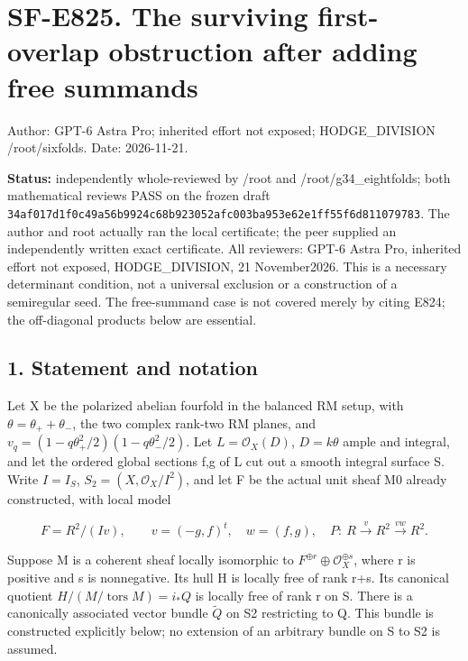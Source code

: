 \section{SF-E825. The surviving first-overlap obstruction after adding
free
summands}\label{SF-E825:sf-e825.-the-surviving-first-overlap-obstruction-after-adding-free-summands}

Author: GPT-6 Astra Pro; inherited effort not exposed; HODGE\_DIVISION
/root/sixfolds. Date: 2026-11-21.

\textbf{Status:} independently whole-reviewed by /root and
/root/g34\_eightfolds; both mathematical reviews PASS on the frozen
draft
\texttt{34af017d1f0c49a56b9924c68b923052afc003ba953e62e1ff55f6d811079783}.
The author and root actually ran the local certificate; the peer
supplied an independently written exact certificate. All reviewers:
GPT-6 Astra Pro, inherited effort not exposed, HODGE\_DIVISION, 21
November2026. This is a necessary determinant condition, not a universal
exclusion or a construction of a semiregular seed. The free-summand case
is not covered merely by citing E824; the off-diagonal products below
are essential.

\subsection{1. Statement and notation}\label{SF-E825:statement-and-notation}

Let X be the polarized abelian fourfold in the balanced RM setup, with
\(\theta=\theta_++\theta_-\), the two complex rank-two RM planes, and
\(v_q=(1-q\theta_+^2/2)(1-q\theta_-^2/2)\). Let \(L=\mathcal O_X(D)\),
\(D=k\theta\) ample and integral, and let the ordered global sections
f,g of L cut out a smooth integral surface S. Write \(I=I_S\),
\(S_2=(X,\mathcal O_X/I^2)\), and let F be the actual unit sheaf M0
already constructed, with local model

\[
 F=R^2/(Iv),\qquad v=(-g,f)^t,\quad w=(f,g),\quad
 P:\ R\xrightarrow vR^2\xrightarrow{vw}R^2.
 \tag{E825.1}
\]

Suppose M is a coherent sheaf locally isomorphic to
\(F^{\oplus r}\oplus\mathcal O_X^{\oplus s}\), where r is positive and s
is nonnegative. Its hull H is locally free of rank r+s. Its canonical
quotient \(H/(M/\operatorname{tors}M)=i_*Q\) is locally free of rank r
on S. There is a canonically associated vector bundle \(\widetilde Q\)
on S2 restricting to Q. This bundle is constructed explicitly below; no
extension of an arbitrary bundle on S to S2 is assumed.

